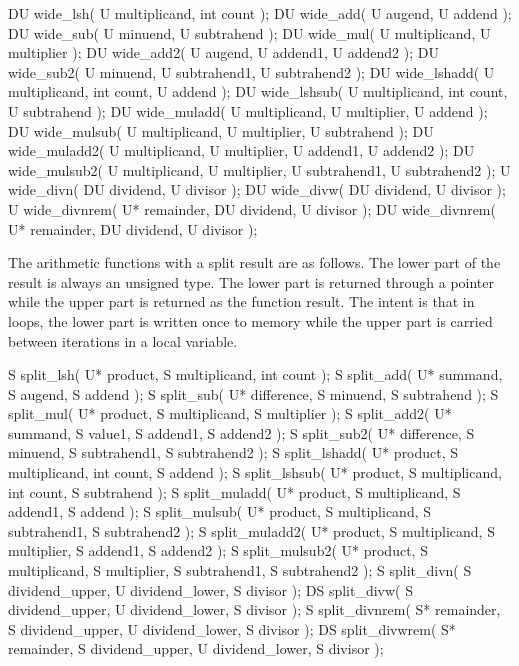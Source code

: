 \begin{addedblock}
\begin{itemdecl}
DU wide_lsh( U multiplicand, int count );
DU wide_add( U augend, U addend );
DU wide_sub( U minuend, U subtrahend );
DU wide_mul( U multiplicand, U multiplier );
DU wide_add2( U augend, U addend1, U addend2 );
DU wide_sub2( U minuend, U subtrahend1, U subtrahend2 );
DU wide_lshadd( U multiplicand, int count, U addend );
DU wide_lshsub( U multiplicand, int count, U subtrahend );
DU wide_muladd( U multiplicand, U multiplier, U addend );
DU wide_mulsub( U multiplicand, U multiplier, U subtrahend );
DU wide_muladd2( U multiplicand, U multiplier, U addend1, U addend2 );
DU wide_mulsub2( U multiplicand, U multiplier, U subtrahend1, U subtrahend2 );
U wide_divn( DU dividend, U divisor );
DU wide_divw( DU dividend, U divisor );
U wide_divnrem( U* remainder, DU dividend, U divisor );
DU wide_divnrem( U* remainder, DU dividend, U divisor );		
\end{itemdecl}

The arithmetic functions with a split result are as follows. The lower part of the result is always an unsigned type. The lower part is returned through a pointer while the upper part is returned as the function result. The intent is that in loops, the lower part is written once to memory while the upper part is carried between iterations in a local variable.

\begin{itemdecl}
S split_lsh( U* product, S multiplicand, int count );
S split_add( U* summand, S augend, S addend );
S split_sub( U* difference, S minuend, S subtrahend );
S split_mul( U* product, S multiplicand, S multiplier );
S split_add2( U* summand, S value1, S addend1, S addend2 );
S split_sub2( U* difference, S minuend, S subtrahend1, S subtrahend2 );
S split_lshadd( U* product, S multiplicand, int count, S addend );
S split_lshsub( U* product, S multiplicand, int count, S subtrahend );
S split_muladd( U* product, S multiplicand, S addend1, S addend );
S split_mulsub( U* product, S multiplicand, S subtrahend1, S subtrahend2 );
S split_muladd2( U* product, S multiplicand, S multiplier, S addend1, S addend2 );
S split_mulsub2( U* product, S multiplicand, S multiplier, S subtrahend1, S subtrahend2 );
S split_divn( S dividend_upper, U dividend_lower, S divisor );
DS split_divw( S dividend_upper, U dividend_lower, S divisor );
S split_divnrem( S* remainder, S dividend_upper, U dividend_lower, S divisor );
DS split_divwrem( S* remainder, S dividend_upper, U dividend_lower, S divisor );


\end{itemdecl}
\end{addedblock}

